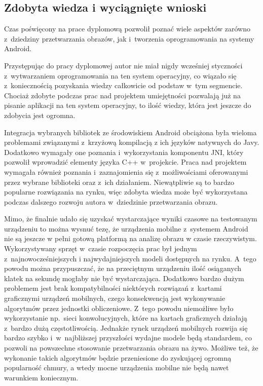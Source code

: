 \subsection{Zdobyta wiedza i wyciągnięte wnioski}


Czas poświęcony na prace dyplomową pozwolił poznać wiele aspektów zarówno z~dziedziny przetwarzania obrazów, jak i~tworzenia oprogramowania na systemy Android. 

\par

Przystępując do pracy dyplomowej autor nie miał nigdy wcześniej styczności z~wytwarzaniem oprogramowania na ten system operacyjny, co wiązało się z~koniecznością pozyskania wiedzy całkowicie od podstaw w~tym segmencie. Chociaż zdobyte podczas prac nad projektem umiejętności pozwalają już na pisanie aplikacji na ten system operacyjny, to ilość wiedzy, która jest jeszcze do zdobycia jest ogromna.

\par

Integracja wybranych bibliotek ze środowiskiem Android obciążona była wieloma problemami związanymi z~krzyżową kompilacją z ich języków natywnych do Javy. Dodatkowo wymagały one poznania i~wykorzystania komponentu JNI, który pozwolił wprowadzić elementy języka C++ w~projekcie. Praca nad projektem wymagała również poznania i~zaznajomienia się z~możliwościami oferowanymi przez wybrane biblioteki oraz z~ich działaniem. Niewątpliwie są to bardzo popularne rozwiązania na rynku, więc zdobyta wiedza może być wykorzystana podczas dalszego rozwoju autora w~dziedzinie przetwarzania obrazu. 

\par

Mimo, że finalnie udało się uzyskać wystarczające wyniki czasowe na testowanym urządzeniu to można wysnuć tezę, że urządzenia mobilne z~systemem Android nie są jeszcze w pełni gotową platformą na analizę obrazu w czasie rzeczywistym. Wykorzystywany sprzęt w~czasie rozpoczęcia prac był jednym z~najnowocześniejszych i najwydajniejszych modeli dostępnych na rynku. A~tego powodu można przypuszczać, że na przeciętnym urządzeniu ilość osiąganych klatek na sekundę mogłaby nie być wystarczająca. Dodatkowo bardzo dużym problemem jest brak kompatybilności niektórych rozwiązań z~kartami graficznymi urządzeń mobilnych, czego konsekwencją jest wykonywanie algorytmów przez jednostki obliczeniowe. Z~tego powodu niemożliwe było wykorzystanie np.~sieci konwolucyjnych, które na kartach graficznych działają z~bardzo dużą częstotliwością. Jednakże rynek urządzeń mobilnych rozwija się bardzo szybko i~w~najbliższej przyszłości wydajne modele będą standardem, co pozwoli na powszechne stosowanie przetwarzania obrazu na żywo. Możliwe też, że wykonanie takich algorytmów będzie przeniesione do zyskującej ogromną popularność chmury, a wtedy mocne urządzenia mobilne nie będą nawet warunkiem koniecznym.





